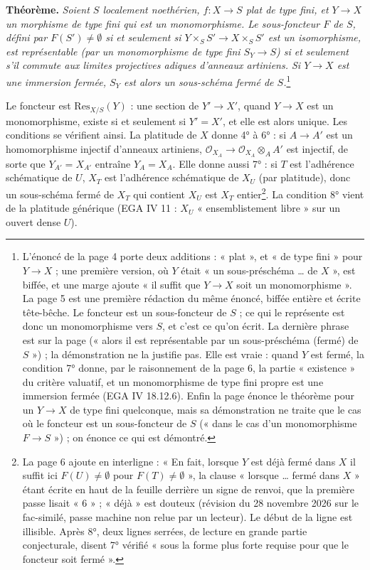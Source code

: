 \documentclass[11pt,a4paper]{article}
\begin{document}
\textbf{Théorème.} \emph{Soient $S$ localement noethérien, $f : X \to S$ plat
de type fini, et $Y \to X$ un morphisme de type fini qui est un monomorphisme.
Le sous-foncteur $F$ de $S$, défini par $F(S') \neq \emptyset$ si et seulement
si $Y \times_S S' \to X \times_S S'$ est un isomorphisme, est représentable
(par un monomorphisme de type fini $S_Y \to S$) si et seulement s'il commute
aux limites projectives adiques d'anneaux artiniens. Si $Y \to X$ est une
immersion fermée, $S_Y$ est alors un sous-schéma fermé de
$S$.}\footnote{L'énoncé de la page 4 porte deux additions : « plat », et « de
type fini » pour $Y \to X$ ; une première version, où $Y$ était « un
sous-préschéma \ldots{} de $X$ », est biffée, et une marge ajoute « il suffit
que $Y \to X$ soit un monomorphisme ». La page 5 est une première rédaction
du même énoncé, biffée entière et écrite tête-bêche. Le foncteur est un
sous-foncteur de $S$ ; ce qui le représente est donc un monomorphisme vers
$S$, et c'est ce qu'on écrit. La dernière phrase est sur la page (« alors il
est représentable par un sous-préschéma (fermé) de $S$ ») ; la démonstration
ne la justifie pas. Elle est vraie : quand $Y$ est fermé, la condition 7°
donne, par le raisonnement de la page 6, la partie « existence » du critère
valuatif, et un monomorphisme de type fini propre est une immersion fermée
(EGA IV 18.12.6). Enfin la page énonce le théorème pour un $Y \to X$ de type
fini quelconque, mais sa démonstration ne traite que le cas où le foncteur
est un sous-foncteur de $S$ (« dans le cas d'un monomorphisme $F \to S$ ») ;
on énonce ce qui est démontré.}

Le foncteur est $\mathrm{Res}_{X/S}(Y)$ : une section de $Y' \to X'$, quand
$Y \to X$ est un monomorphisme, existe si et seulement si $Y' = X'$, et elle
est alors unique. Les conditions se vérifient ainsi. La platitude de $X$
donne 4° à 6° : si $A \to A'$ est un homomorphisme injectif d'anneaux
artiniens, $\mathcal{O}_{X_A} \to \mathcal{O}_{X_A} \otimes_A A'$ est injectif,
de sorte que $Y_{A'} = X_{A'}$ entraîne $Y_A = X_A$. Elle donne aussi 7° : si $T$
est l'adhérence schématique de $U$, $X_T$ est l'adhérence schématique de $X_U$
(par platitude), donc un sous-schéma fermé de $X_T$ qui contient $X_U$ est
$X_T$ entier\footnote{La page 6 ajoute en interligne : « En fait,
lorsque $Y$ est déjà fermé dans $X$ il suffit ici $F(U) \neq \emptyset$ pour
$F(T) \neq \emptyset$ », la clause « lorsque \ldots{} fermé dans $X$ » étant
écrite en haut de la feuille derrière un signe de renvoi, que la première passe
lisait « 6 » ; « déjà » est douteux (révision du 28 novembre 2026 sur le fac-similé, passe machine non relue par un lecteur). Le début de la ligne est
illisible. Après 8°, deux lignes serrées, de lecture en grande partie
conjecturale, disent 7° vérifié « sous la forme plus forte requise pour que le
foncteur soit fermé ».}. La condition 8° vient de la platitude générique (EGA IV 11 : $X_U$
« ensemblistement libre » sur un ouvert dense $U$).
\end{document}
